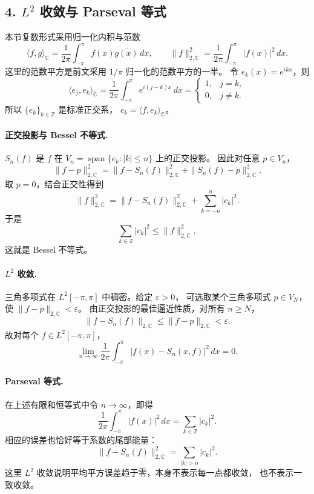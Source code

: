 \documentclass[11pt,a4paper]{ctexart}
\begin{document}
\subsection*{4. $L^2$ 收敛与 Parseval 等式}
本节复数形式采用归一化内积与范数
\[
 \langle f,g\rangle_{\mathbb C}
 =\frac{1}{2\pi}\int_{-\pi}^{\pi}f(x)\overline{g(x)}\,dx,
 \qquad
 \|f\|_{2,\mathbb C}^2
 =\frac{1}{2\pi}\int_{-\pi}^{\pi}|f(x)|^2\,dx.
\]
这里的范数平方是前文采用 $1/\pi$ 归一化的范数平方的一半。
令 $e_k(x)=e^{ikx}$，则
\[
 \langle e_j,e_k\rangle_{\mathbb C}
 =\frac{1}{2\pi}\int_{-\pi}^{\pi}e^{i(j-k)x}\,dx
 =\begin{cases}1,&j=k,\\0,&j\ne k.\end{cases}
\]
所以 $\{e_k\}_{k\in\mathbb Z}$ 是标准正交系，
$c_k=\langle f,e_k\rangle_{\mathbb C}$。

\paragraph{正交投影与 Bessel 不等式.}
$S_n(f)$ 是 $f$ 在
$V_n=\operatorname{span}\{e_k:|k|\leq n\}$ 上的正交投影。
因此对任意 $p\in V_n$，
\[
 \|f-p\|_{2,\mathbb C}^2
 =\|f-S_n(f)\|_{2,\mathbb C}^2
 +\|S_n(f)-p\|_{2,\mathbb C}^2.
\]
取 $p=0$，结合正交性得到
\[
 \|f\|_{2,\mathbb C}^2
 =\|f-S_n(f)\|_{2,\mathbb C}^2
 +\sum_{k=-n}^{n}|c_k|^2.
\]
于是
\[
 \sum_{k\in\mathbb Z}|c_k|^2\leq\|f\|_{2,\mathbb C}^2,
\]
这就是 Bessel 不等式。

\paragraph{$L^2$ 收敛.}
三角多项式在 $L^2[-\pi,\pi]$ 中稠密。给定 $\varepsilon>0$，
可选取某个三角多项式 $p\in V_N$，使
$\|f-p\|_{2,\mathbb C}<\varepsilon$。
由正交投影的最佳逼近性质，对所有 $n\geq N$，
\[
 \|f-S_n(f)\|_{2,\mathbb C}
 \leq\|f-p\|_{2,\mathbb C}<\varepsilon.
\]
故对每个 $f\in L^2[-\pi,\pi]$，
\[
 \lim_{n\to\infty}\frac{1}{2\pi}
 \int_{-\pi}^{\pi}|f(x)-S_n(x,f)|^2\,dx=0.
\]

\paragraph{Parseval 等式.}
在上述有限和恒等式中令 $n\to\infty$，即得
\[
 \boxed{\frac{1}{2\pi}\int_{-\pi}^{\pi}|f(x)|^2\,dx
 =\sum_{k\in\mathbb Z}|c_k|^2.}
\]
相应的误差也恰好等于系数的尾部能量：
\[
 \|f-S_n(f)\|_{2,\mathbb C}^2
 =\sum_{|k|>n}|c_k|^2.
\]
这里 $L^2$ 收敛说明平均平方误差趋于零，本身不表示每一点都收敛，
也不表示一致收敛。
\end{document}
